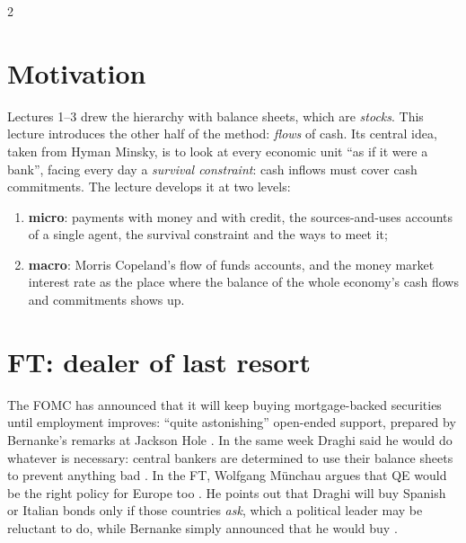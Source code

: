 \begin{paracol}{2}
\section*{Motivation}
Lectures 1--3 drew the hierarchy with balance sheets, which are \emph{stocks}. This lecture introduces the other half of the
method: \emph{flows} of cash. Its central idea, taken from Hyman Minsky, is to look at every economic unit ``as if it were a
bank'', facing every day a \emph{survival constraint}: cash inflows must cover cash commitments. The lecture develops it at two
levels:
\begin{enumerate}
  \item \textbf{micro}: payments with money and with credit, the sources-and-uses accounts of a single agent, the survival
        constraint and the ways to meet it;
  \item \textbf{macro}: Morris Copeland's flow of funds accounts, and the money market interest rate as the place where the
        balance of the whole economy's cash flows and commitments shows up.
\end{enumerate}

\section{FT: dealer of last resort}\label{sec:mv-ft}

\begin{casestudy}
The FOMC has announced that it will keep buying mortgage-backed securities until employment improves: ``quite astonishing'' open-ended
support, prepared by Bernanke's remarks at Jackson Hole . In the same week Draghi said he would do
whatever is necessary: central bankers are determined to use their balance sheets to prevent anything bad . In the FT,
Wolfgang Münchau argues that QE would be the right policy for Europe too . He points out that Draghi will buy Spanish or
Italian bonds only if those countries \emph{ask}, which a political leader may be reluctant to do, while Bernanke simply announced
that he would buy .
\end{casestudy}


\end{paracol}
